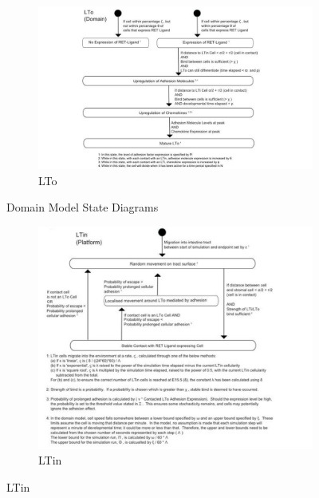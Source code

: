 \documentclass{UoYCSproject}
\begin{document}
\begin{figure}[htp]\ContinuedFloat
\centering
\begin{subfigure}{0.95\textwidth}
\centering
\includegraphics[width=\textwidth]{Appendix/Models/Domain/LTo}
\caption{LTo}
\end{subfigure}

\caption{Domain Model State Diagrams}
\label{fig:domain_state_diagrams}
\end{figure}

\begin{figure}[htp]
\centering
\begin{subfigure}{0.95\textwidth}
\centering
\includegraphics[width=\textwidth]{Appendix/Models/Platform/LTin}
\caption{LTin}
\end{subfigure}
\end{figure}
\end{document}
